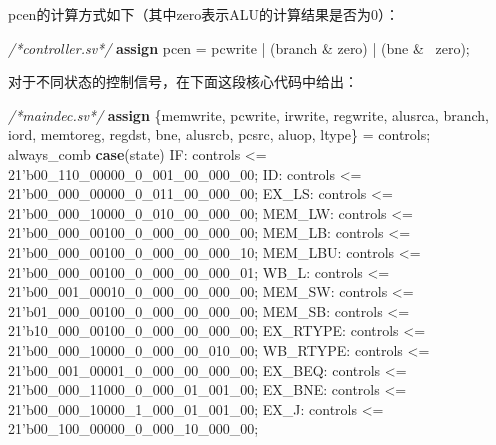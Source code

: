\documentclass[]{article}
\newenvironment{Shaded}{}{}
\newcommand{\KeywordTok}[1]{\textcolor[rgb]{0.00,0.44,0.13}{\textbf{#1}}}
\newcommand{\DecValTok}[1]{\textcolor[rgb]{0.25,0.63,0.44}{#1}}
\newcommand{\BaseNTok}[1]{\textcolor[rgb]{0.25,0.63,0.44}{#1}}
\newcommand{\CommentTok}[1]{\textcolor[rgb]{0.38,0.63,0.69}{\textit{#1}}}
\newcommand{\NormalTok}[1]{#1}
\begin{document}
pcen的计算方式如下（其中zero表示ALU的计算结果是否为0）：

\begin{Shaded}
\begin{Highlighting}[]
\CommentTok{/*controller.sv*/}
\KeywordTok{assign}\NormalTok{ pcen = pcwrite | (branch & zero) | (bne & ~zero);}
\end{Highlighting}
\end{Shaded}

对于不同状态的控制信号，在下面这段核心代码中给出：

\begin{Shaded}
\begin{Highlighting}[]
\CommentTok{/*maindec.sv*/}
\KeywordTok{assign}\NormalTok{ \{memwrite, pcwrite, irwrite, regwrite,}
\NormalTok{        alusrca, branch, iord, memtoreg, regdst,}
\NormalTok{        bne, alusrcb, pcsrc, aluop, ltype\} = controls; }
\NormalTok{always_comb	}
	\KeywordTok{case}\NormalTok{(state)}
            \DecValTok{IF:}\NormalTok{         controls <= }\BaseNTok{21'b00_110_00000_0_001_00_000_00}\NormalTok{;}
            \DecValTok{ID:}\NormalTok{         controls <= }\BaseNTok{21'b00_000_00000_0_011_00_000_00}\NormalTok{;}
            \DecValTok{EX_LS:}\NormalTok{      controls <= }\BaseNTok{21'b00_000_10000_0_010_00_000_00}\NormalTok{;}
            \DecValTok{MEM_LW:}\NormalTok{     controls <= }\BaseNTok{21'b00_000_00100_0_000_00_000_00}\NormalTok{;}
            \DecValTok{MEM_LB:}\NormalTok{     controls <= }\BaseNTok{21'b00_000_00100_0_000_00_000_10}\NormalTok{;}
            \DecValTok{MEM_LBU:}\NormalTok{    controls <= }\BaseNTok{21'b00_000_00100_0_000_00_000_01}\NormalTok{;}
            \DecValTok{WB_L:}\NormalTok{       controls <= }\BaseNTok{21'b00_001_00010_0_000_00_000_00}\NormalTok{;}
            \DecValTok{MEM_SW:}\NormalTok{     controls <= }\BaseNTok{21'b01_000_00100_0_000_00_000_00}\NormalTok{;}
            \DecValTok{MEM_SB:}\NormalTok{     controls <= }\BaseNTok{21'b10_000_00100_0_000_00_000_00}\NormalTok{;}
            \DecValTok{EX_RTYPE:}\NormalTok{   controls <= }\BaseNTok{21'b00_000_10000_0_000_00_010_00}\NormalTok{;}
            \DecValTok{WB_RTYPE:}\NormalTok{   controls <= }\BaseNTok{21'b00_001_00001_0_000_00_000_00}\NormalTok{;}
            \DecValTok{EX_BEQ:}\NormalTok{     controls <= }\BaseNTok{21'b00_000_11000_0_000_01_001_00}\NormalTok{;}
            \DecValTok{EX_BNE:}\NormalTok{     controls <= }\BaseNTok{21'b00_000_10000_1_000_01_001_00}\NormalTok{;}
            \DecValTok{EX_J:}\NormalTok{       controls <= }\BaseNTok{21'b00_100_00000_0_000_10_000_00}\NormalTok{;}

\end{Highlighting}
\end{Shaded}
\end{document}
